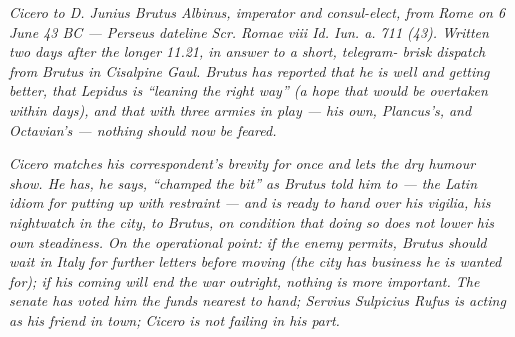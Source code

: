 
\textit{Cicero to D. Junius Brutus Albinus, imperator and
consul-elect, from Rome on 6 June 43 BC --- Perseus dateline
\textit{Scr. Romae viii Id. Iun. a. 711 (43)}. Written two
days after the longer 11.21, in answer to a short, telegram-
brisk dispatch from Brutus in Cisalpine Gaul. Brutus has
reported that he is well and getting better, that Lepidus
is ``leaning the right way'' (a hope that would be overtaken
within days), and that with three armies in play --- his
own, Plancus's, and Octavian's --- nothing should now be
feared.}

\textit{Cicero matches his correspondent's brevity for once
and lets the dry humour show. He has, he says, ``champed the
bit'' as Brutus told him to --- the Latin idiom for putting
up with restraint --- and is ready to hand over his
\textit{vigilia}, his nightwatch in the city, to Brutus, on
condition that doing so does not lower his own steadiness.
On the operational point: if the enemy permits, Brutus
should wait in Italy for further letters before moving (the
city has business he is wanted for); if his coming will end
the war outright, nothing is more important. The senate has
voted him the funds nearest to hand; Servius Sulpicius
Rufus is acting as his friend in town; Cicero is not
failing in his part.}
